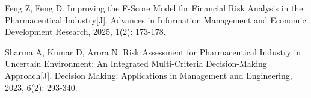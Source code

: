 \documentclass[12pt,a4paper,fontset=windows,UTF8]{ctexart}
\begin{document}
\begin{thesref}
  \item Feng Z, Feng D. Improving the F-Score Model for Financial Risk Analysis in the Pharmaceutical Industry[J]. Advances in Information Management and Economic Development Research, 2025, 1(2): 173-178.
  \item Sharma A, Kumar D, Arora N. Risk Assessment for Pharmaceutical Industry in Uncertain Environment: An Integrated Multi-Criteria Decision-Making Approach[J]. Decision Making: Applications in Management and Engineering, 2023, 6(2): 293-340.
\end{thesref}

\vspace{3\baselineskip}
\end{document}
